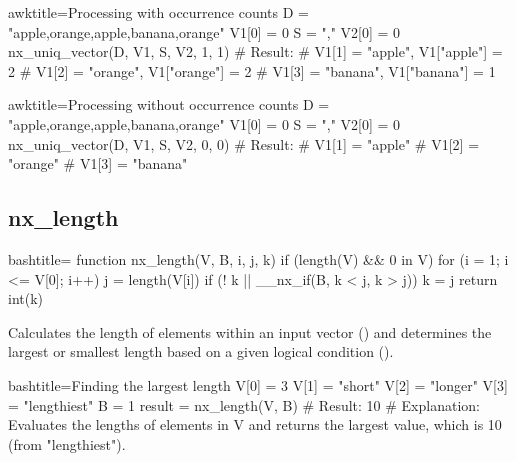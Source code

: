 \begin{NexCodeBox}{awk}{title={Processing with occurrence counts}}
	D = "apple,orange,apple,banana,orange"
	V1[0] = 0
	S = ","
	V2[0] = 0
	nx_uniq_vector(D, V1, S, V2, 1, 1)
	# Result:
	# V1[1] = "apple", V1["apple"] = 2
	# V1[2] = "orange", V1["orange"] = 2
	# V1[3] = "banana", V1["banana"] = 1
\end{NexCodeBox}

\begin{NexCodeBox}{awk}{title={Processing without occurrence counts}}
	D = "apple,orange,apple,banana,orange"
	V1[0] = 0
	S = ","
	V2[0] = 0
	nx_uniq_vector(D, V1, S, V2, 0, 0)
	# Result:
	# V1[1] = "apple"
	# V1[2] = "orange"
	# V1[3] = "banana"
\end{NexCodeBox}

\newpage
\subsection{nx_length}
\label{nx_length}
\begin{NexCodeBox}{bash}{title={}}
function nx_length(V, B,	i, j, k)
{
	if (length(V) && 0 in V) {
		for (i = 1; i <= V[0]; i++) {
			j = length(V[i])
			if (! k || __nx_if(B, k < j, k > j))
				k = j
		}
		return int(k)
	}
}
\end{NexCodeBox}

\begin{NexMainBox}
	\begin{NexMainBox}
		Calculates the length of elements within an input vector () and determines the largest or smallest length based on a given logical condition ().
	\end{NexMainBox}
	\begin{NexMainBox}
		\begin{NexListDark}
		\end{NexListDark}
	\end{NexMainBox}
\end{NexMainBox}

\begin{NexCodeBox}{bash}{title={Finding the largest length}}
	V[0] = 3
	V[1] = "short"
	V[2] = "longer"
	V[3] = "lengthiest"
	B = 1
	result = nx_length(V, B)
	# Result: 10
	# Explanation: Evaluates the lengths of elements in V and returns the largest value, which is 10 (from "lengthiest").
\end{NexCodeBox}

